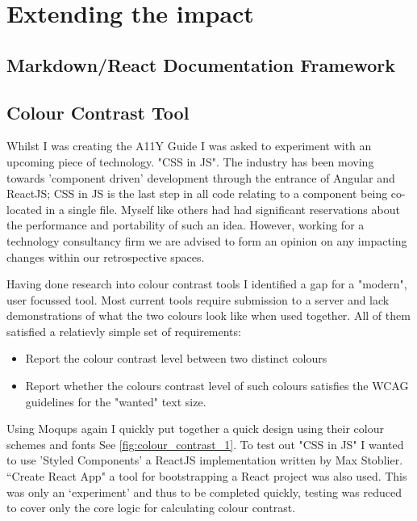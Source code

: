 \section{Extending the impact}
\subsection{Markdown/React Documentation Framework}
\subsection{Colour Contrast Tool}
Whilst I was creating the A11Y Guide I was asked to experiment with an
upcoming piece of technology. "CSS in JS". The industry has been moving
towards 'component driven' development through the entrance of Angular and
ReactJS; CSS in JS is the last step in all code relating to a
component being co-located in a single file. Myself like others had had
significant reservations about the performance and portability of such an
idea. However, working for a technology consultancy firm we are advised to
form an opinion on any impacting changes within our retrospective spaces.

Having done research into colour contrast tools I identified a gap for a
"modern", user focussed tool. Most current tools require submission to a
server and lack demonstrations of what the two colours look like when used
together. All of them satisfied a relatievly simple set of requirements:
\begin{itemize}
\item Report the colour contrast level between two distinct colours
\item Report whether the colours contrast level of such colours satisfies the
 WCAG guidelines for the "wanted" text size.
\end{itemize}

Using Moqups again I quickly put together a quick design using their colour
schemes and fonts See \ref{fig:colour_contrast_1}. To test out "CSS in JS" I
wanted to use 'Styled Components' a ReactJS implementation written by Max
Stoblier. ``Create React App" a tool for bootstrapping a React project was also
used. This was only an `experiment' and thus to be completed quickly, testing
was reduced to cover only the core logic for calculating colour contrast.

